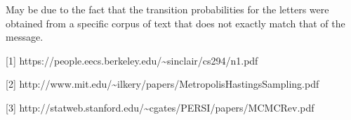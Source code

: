 \documentclass[11pt]{article}
\begin{document}
May be due to the fact that the transition probabilities for the letters
were obtained from a specific corpus of text that does not exactly match
that of the message.

    {[}1{]}
https://people.eecs.berkeley.edu/\textasciitilde{}sinclair/cs294/n1.pdf

{[}2{]}
http://www.mit.edu/\textasciitilde{}ilkery/papers/MetropolisHastingsSampling.pdf

{[}3{]}
http://statweb.stanford.edu/\textasciitilde{}cgates/PERSI/papers/MCMCRev.pdf


    
    
    
    
\end{document}
